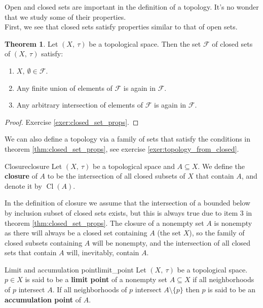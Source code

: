 \documentclass[a4paper]{book}
\theoremstyle{definition}
\newtheorem{theorem}{Theorem}[section]
\theoremstyle{ejemplo}
\theoremstyle{demostracion}
\DeclareMathOperator{\closure}{Cl}
\begin{document}
Open and closed sets are important in the definition of a topology. It's no wonder that we study some of their properties.\\ 
First, we see that closed sets satisfy properties similar to that of open sets.

\begin{theorem}\label{thm:closed_set_props}
	Let $(X,\ \tau)$ be a topological space. Then the set $\mathcal{F}$ of closed sets of $(X,\ \tau)$ satisfy:
	\begin{enumerate}
		\item
		$X,\ \emptyset \in \mathcal{F}$.
		\item
		Any finite union of elements of $\mathcal{F}$ is again in $\mathcal{F}$.
		\item
		Any arbitrary intersection of elements of $\mathcal{F}$ is again in $\mathcal{F}$.
	\end{enumerate}	
\end{theorem}

\begin{proof}
	Exercise \eqref{exer:closed_set_props}.
\end{proof}

We can also define a topology via a family of sets that satisfy the conditions in theorem \eqref{thm:closed_set_props}, see exercise \eqref{exer:topology_from_closed}.

\begin{define}{Closure}{closure}
	Let $(X,\ \tau)$ be a topological space and $A \subseteq X$. We define the \textbf{closure} of $A$ to be the intersection of all closed subsets of $X$ that contain $A$, and denote it by $\closure(A)$.
\end{define}

In the definition of closure we assume that the intersection of a bounded below by inclusion subset of closed sets exists, but this is always true due to item 3 in theorem \eqref{thm:closed_set_props}. The closure of a nonempty set $A$ is nonempty as there will always be a closed set containing $A$ (the set $X$), so the family of closed subsets containing $A$ will be nonempty, and the intersection of all closed sets that contain $A$ will, inevitably, contain $A$.

\begin{define}{Limit and accumulation point}{limit_point}
	Let $(X,\ \tau)$ be a topological space. $p \in X$ is said to be a \textbf{limit point} of a nonempty set $A \subseteq X$ if all neighborhoods of $p$ intersect $A$. If all neighborhoods of $p$ intersect $A \setminus \{ p\}$ then $p$ is said to be an \textbf{accumulation point} of $A$.
\end{define}
\end{document}
